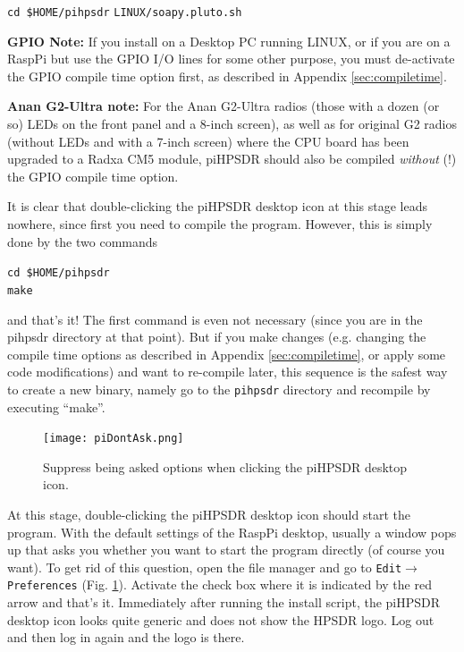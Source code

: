 \documentclass[12pt]{book}
\def\grtt#1{\texttt{\color{magenta}#1}}
\def\pH{pi\-HPSDR\xspace}
\begin{document}
\grtt{cd \$HOME/pihpsdr}
\grtt{LINUX/soapy.pluto.sh}

\bigskip

\textbf{\color{red} GPIO Note:} If you install on a Desktop PC running LINUX, or if you are on a RaspPi but use
the GPIO I/O lines for some other purpose, you must de-activate the GPIO compile time option
first, as described in Appendix \ref{sec:compiletime}.

\textbf{\color{red}Anan G2-Ultra note:} For the Anan G2-Ultra radios (those with a dozen (or so) LEDs on
the front panel and a 8-inch screen), as well as for original G2 radios (without LEDs and with a 7-inch screen)
where the CPU board has been upgraded to a Radxa CM5 module, \pH should also be compiled \textit{without} (!) the
GPIO compile time option.

\bigskip

It is clear that double-clicking the \pH desktop icon at this stage leads nowhere,
since first you need to compile the program.
However,
this is simply done by the two commands

\grtt{cd \$HOME/pihpsdr} \\
\grtt{make}

and that's it! The first command is even not necessary (since you are in the pihpsdr
directory at that point).
But if you make changes (e.g. changing the compile time options as described in
Appendix \ref{sec:compiletime}, or apply some code modifications)
and want to re-compile later, this sequence is the safest way to create a new binary,
namely go to the \texttt{pihpsdr}
directory and recompile by executing ``make''.

\begin{figure}[h!]
\center
\texttt{[image: piDontAsk.png]}
\caption{Suppress being asked options when clicking the \pH desktop icon.}
\label{fig:piDontAsk}
\end{figure}

At this stage, double-clicking the \pH desktop icon should start the program.
With the default settings of the RaspPi desktop, usually a window pops up that
asks you whether you want to start the program directly (of course you want).
To get rid of this question, open the file manager
and go to
\texttt{Edit}$\to$\texttt{Preferences} (Fig. \ref{fig:piDontAsk}). Activate the check
box where it is indicated by the red arrow and that's it.
Immediately after running the install script, the \pH desktop icon
looks quite generic and does not show the HPSDR logo. Log out and then log in again
and the logo is there.
\end{document}
